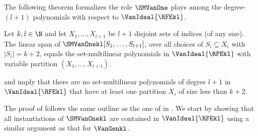 \documentclass{toc}
\begin{document}
The following theorem formalizes the role \(\SMVanOne\) plays among the degree-\((l+1)\) polynomials with respect to \(\VanIdeal{\RFEkl}\).
\begin{theorem}
  \label{thm.smvan1}
  Let \(k,l \in \N\)
  and let \(X_1, \ldots, X_{l+1}\) be \(l+1\) disjoint sets of
  indices (of any size).
  The linear span of $\SMVanOnekl[S_1,\dots,S_{l+1}]$, over all choices of
  $S_i\subseteq X_i$ with $|S_i|=k+2$, equals the set-multilinear 
  polynomials in $\VanIdeal{\RFEkl}$ with variable partition $(X_1, \dots, X_{l+1})$.
\end{theorem}
 and  imply  that there are no set-multilinear polynomials of degree $l+1$ in $\VanIdeal{\RFEkl}$ that have at least one partition $X_i$ of size less than $k+2$.

The proof of  follows the same outline as the one of  in . We start by showing that all instantiations of $\SMVanOnekl$ are contained in $\VanIdeal{\RFEkl}$ using a similar argument as that for $\VanGenkl$.
\end{document}
